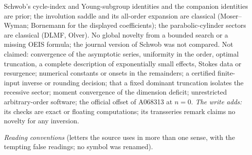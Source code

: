 \begin{writenote}
Schwob's cycle-index and Young-subgroup identities and the companion
identities are prior; the involution saddle and its all-order expansion are
classical (Moser--Wyman; Bornemann for the displayed coefficients); the
parabolic-cylinder sectors are classical (DLMF, Olver). No global novelty
from a bounded search or a missing OEIS formula; the journal version of
Schwob was not compared. Not claimed: convergence of the asymptotic series,
uniformity in the order, optimal truncation, a complete description of
exponentially small effects, Stokes data or resurgence; numerical constants
or onsets in the remainders; a certified finite-input inverse or rounding
decision; that a fixed dominant truncation isolates the recessive sector;
moment convergence of the dimension deficit; unrestricted arbitrary-order
software; the official offset of A068313 at $n=0$. \emph{The write adds:}
its checks are exact or floating computations; its transseries remark claims
no novelty for any inversion.
\end{writenote}
\medskip
\begingroup\small
\noindent\emph{Reading conventions} (letters the source uses in more than one
sense, with the tempting false readings; no symbol was renamed).\par\smallskip
\renewcommand{\arraystretch}{1.1}
